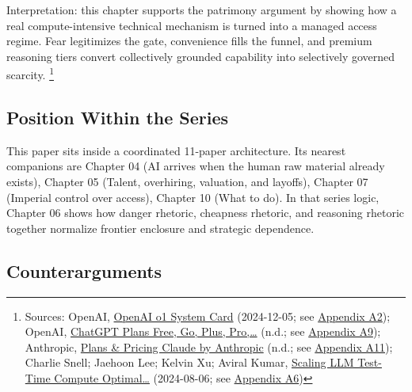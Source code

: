 \documentclass[
  american,
  11pt,
  letterpaper,
]{article}
\begin{document}
Interpretation: this chapter supports the patrimony argument by showing
how a real compute-intensive technical mechanism is turned into a
managed access regime. Fear legitimizes the gate, convenience fills the
funnel, and premium reasoning tiers convert collectively grounded
capability into selectively governed scarcity. \footnote{Sources:
  OpenAI, \href{https://openai.com/index/openai-o1-system-card/}{OpenAI
  o1 System Card} (2024-12-05; see
  \hyperref[appendix-a2-openai-o1-system-card]{Appendix A2}); OpenAI,
  \href{https://chatgpt.com/pricing/}{ChatGPT Plans \textbar{} Free, Go,
  Plus, Pro,\ldots{}} (n.d.; see
  \hyperref[appendix-a9-chatgpt-plans-free-go-plus-pro-business-and-enterprise]{Appendix
  A9}); Anthropic, \href{https://claude.com/pricing}{Plans \& Pricing
  \textbar{} Claude by Anthropic} (n.d.; see
  \hyperref[appendix-a11-plans-pricing-claude-by-anthropic]{Appendix
  A11}); Charlie Snell; Jaehoon Lee; Kelvin Xu; Aviral Kumar,
  \href{https://arxiv.org/abs/2408.03314}{Scaling LLM Test-Time Compute
  Optimal\ldots{}} (2024-08-06; see
  \hyperref[appendix-a6-scaling-llm-test-time-compute-optimally-can-be-more-effective-than-scaling-model-parameters]{Appendix
  A6})}

\subsection{Position Within the
Series}\label{position-within-the-series}

This paper sits inside a coordinated 11-paper architecture. Its nearest
companions are Chapter 04 (AI arrives when the human raw material
already exists), Chapter 05 (Talent, overhiring, valuation, and
layoffs), Chapter 07 (Imperial control over access), Chapter 10 (What to
do). In that series logic, Chapter 06 shows how danger rhetoric,
cheapness rhetoric, and reasoning rhetoric together normalize frontier
enclosure and strategic dependence.

\subsection{Counterarguments}\label{counterarguments}
\end{document}
